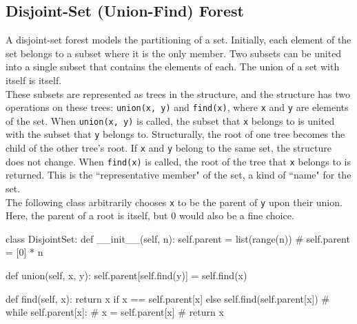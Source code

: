 \documentclass[12pt, titlepage]{article}
\begin{document}
\subsection{Disjoint-Set (Union-Find) Forest} \label{disjoint-set}
A disjoint-set forest models the partitioning of a set. Initially, each element of the set belongs to a subset where it is the only member. Two subsets can be united into a single subset that contains the elements of each. The union of a set with itself is itself. \\

These subsets are represented as trees in the structure, and the structure has two operations on these trees: \texttt{union(x, y)} and \texttt{find(x)}, where \texttt{x} and \texttt{y} are elements of the set. When \texttt{union(x, y)} is called, the subset that \texttt{x} belongs to is united with the subset that \texttt{y} belongs to. Structurally, the root of one tree becomes the child of the other tree's root. If \texttt{x} and \texttt{y} belong to the same set, the structure does not change. When \texttt{find(x)} is called, the root of the tree that \texttt{x} belongs to is returned. This is the ``representative member" of the set, a kind of ``name" for the set. \\

The following class arbitrarily chooses \texttt{x} to be the parent of \texttt{y} upon their union. Here, the parent of a root is itself, but $0$ would also be a fine choice.
\medskip
\begin{python}
class DisjointSet:
    def __init__(self, n):
        self.parent = list(range(n))
        # self.parent = [0] * n

    def union(self, x, y):
        self.parent[self.find(y)] = self.find(x)

    def find(self, x):
        return x if x == self.parent[x] else self.find(self.parent[x])
        # while self.parent[x]:
        #     x = self.parent[x]
        # return x
\end{python}
\bigskip
\end{document}
